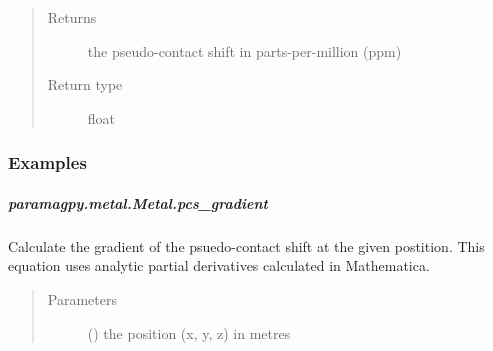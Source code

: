 \documentclass[a4paper,10pt,english,openany,oneside]{sphinxmanual}
\begin{document}
\begin{fulllineitems}
\begin{fulllineitems}
\begin{fulllineitems}
\begin{quote}
\begin{description}
\item[{Returns}] \leavevmode
{} \textendash{} the pseudo-contact shift in parts-per-million (ppm)

\item[{Return type}] \leavevmode
float

\end{description}\end{quote}
\subsubsection*{Examples}

%
\begin{sphinxVerbatim}[commandchars=\\\{\}]
  
\PYG{p}{[}\PYG{p}{]}
\end{sphinxVerbatim}

\end{fulllineitems}



\subparagraph{paramagpy.metal.Metal.pcs\_gradient}
\label{\detokenize{reference/generated/paramagpy.metal.Metal.pcs_gradient:paramagpy-metal-metal-pcs-gradient}}\label{\detokenize{reference/generated/paramagpy.metal.Metal.pcs_gradient::doc}}

\begin{fulllineitems}
\label{\detokenize{reference/generated/paramagpy.metal.Metal.pcs_gradient:paramagpy.metal.Metal.pcs_gradient}}
Calculate the gradient of the psuedo-contact shift
at the given postition.
This equation uses analytic partial derivatives calculated in
Mathematica.
\begin{quote}\begin{description}
\item[{Parameters}] \leavevmode
{} () \textendash{} the position (x, y, z) in metres


\end{description}
\end{quote}
\end{fulllineitems}
\end{fulllineitems}
\end{fulllineitems}
\end{document}
